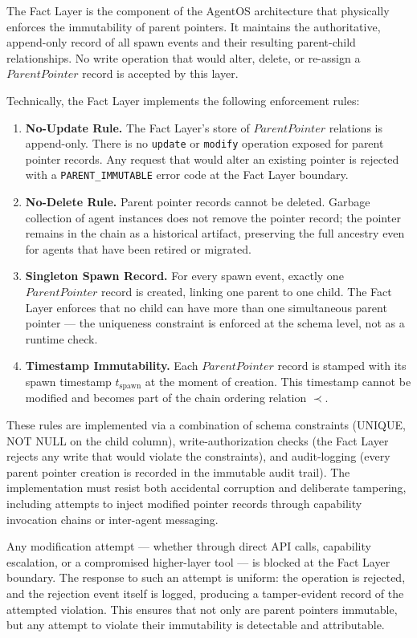 The Fact Layer is the component of the AgentOS architecture that physically enforces the immutability of parent pointers. It maintains the authoritative, append-only record of all spawn events and their resulting parent-child relationships. No write operation that would alter, delete, or re-assign a $\textit{ParentPointer}$ record is accepted by this layer.

Technically, the Fact Layer implements the following enforcement rules:

\begin{enumerate}
\item \textbf{No-Update Rule.} The Fact Layer's store of $\textit{ParentPointer}$ relations is append-only. There is no \texttt{update} or \texttt{modify} operation exposed for parent pointer records. Any request that would alter an existing pointer is rejected with a \texttt{PARENT\_IMMUTABLE} error code at the Fact Layer boundary.
\item \textbf{No-Delete Rule.} Parent pointer records cannot be deleted. Garbage collection of agent instances does not remove the pointer record; the pointer remains in the chain as a historical artifact, preserving the full ancestry even for agents that have been retired or migrated.
\item \textbf{Singleton Spawn Record.} For every spawn event, exactly one $\textit{ParentPointer}$ record is created, linking one parent to one child. The Fact Layer enforces that no child can have more than one simultaneous parent pointer — the uniqueness constraint is enforced at the schema level, not as a runtime check.
\item \textbf{Timestamp Immutability.} Each $\textit{ParentPointer}$ record is stamped with its spawn timestamp $t_{\text{spawn}}$ at the moment of creation. This timestamp cannot be modified and becomes part of the chain ordering relation $\prec$.
\end{enumerate}

These rules are implemented via a combination of schema constraints (UNIQUE, NOT NULL on the child column), write-authorization checks (the Fact Layer rejects any write that would violate the constraints), and audit-logging (every parent pointer creation is recorded in the immutable audit trail). The implementation must resist both accidental corruption and deliberate tampering, including attempts to inject modified pointer records through capability invocation chains or inter-agent messaging.

Any modification attempt — whether through direct API calls, capability escalation, or a compromised higher-layer tool — is blocked at the Fact Layer boundary. The response to such an attempt is uniform: the operation is rejected, and the rejection event itself is logged, producing a tamper-evident record of the attempted violation. This ensures that not only are parent pointers immutable, but any attempt to violate their immutability is detectable and attributable.

